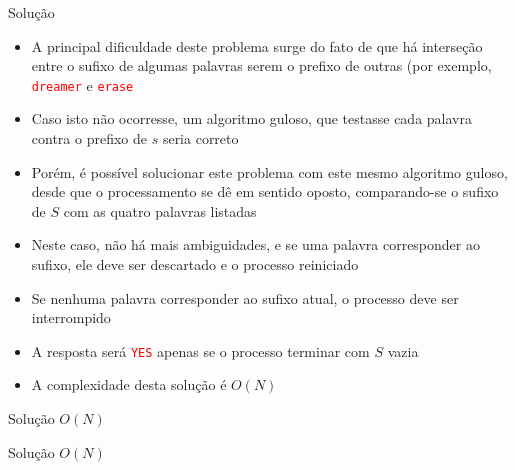\begin{frame}[fragile]{Solução}

    \begin{itemize}
        \item A principal dificuldade deste problema surge do fato de que há interseção
            entre o sufixo de algumas palavras serem o prefixo de outras (por exemplo,
            \texttt{\textcolor{red}{dreamer}} e \texttt{\textcolor{red}{erase}}

        \item Caso isto não ocorresse, um algoritmo guloso, que testasse cada palavra
            contra o prefixo de $s$ seria correto

        \item Porém, é possível solucionar este problema com este mesmo algoritmo guloso,
            desde que o processamento se dê em sentido oposto, comparando-se o sufixo de
            $S$ com as quatro palavras listadas

        \item Neste caso, não há mais ambiguidades, e se uma palavra corresponder ao sufixo,
            ele deve ser descartado e o processo reiniciado

        \item Se nenhuma palavra corresponder ao sufixo atual, o processo deve ser interrompido

        \item A resposta será \texttt{\textcolor{red}{YES}} apenas se o processo terminar
            com $S$ vazia

        \item A complexidade desta solução é $O(N)$
    \end{itemize}

\end{frame}

\begin{frame}[fragile]{Solução $O(N)$}
\end{frame}

\begin{frame}[fragile]{Solução $O(N)$}
\end{frame}
